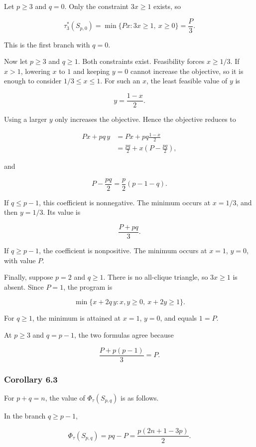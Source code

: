\documentclass[
  11pt,
]{article}
\begin{document}
Let \(p\ge3\) and \(q=0\). Only the constraint \(3x\ge1\) exists, so

\[
\tau_3^*(S_{p,0})
=
\min\{Px:3x\ge1,\ x\ge0\}
=
\frac P3.
\]

This is the first branch with \(q=0\).

Now let \(p\ge3\) and \(q\ge1\). Both constraints exist. Feasibility
forces \(x\ge1/3\). If \(x>1\), lowering \(x\) to \(1\) and keeping
\(y=0\) cannot increase the objective, so it is enough to consider
\(1/3\le x\le1\). For such an \(x\), the least feasible value of \(y\)
is

\[
y=\frac{1-x}{2}.
\]

Using a larger \(y\) only increases the objective. Hence the objective
reduces to

\[
\begin{aligned}
Px+pq\,y
&=
Px+pq\frac{1-x}{2}\\
&=
\frac{pq}{2}
+
x\left(P-\frac{pq}{2}\right),
\end{aligned}
\]

and

\[
P-\frac{pq}{2}
=
\frac p2(p-1-q).
\]

If \(q\le p-1\), this coefficient is nonnegative. The minimum occurs at
\(x=1/3\), and then \(y=1/3\). Its value is

\[
\frac{P+pq}{3}.
\]

If \(q\ge p-1\), the coefficient is nonpositive. The minimum occurs at
\(x=1\), \(y=0\), with value \(P\).

Finally, suppose \(p=2\) and \(q\ge1\). There is no all-clique triangle,
so \(3x\ge1\) is absent. Since \(P=1\), the program is

\[
\min\{x+2q\,y:x,y\ge0,\ x+2y\ge1\}.
\]

For \(q\ge1\), the minimum is attained at \(x=1\), \(y=0\), and equals
\(1=P\).

At \(p\ge3\) and \(q=p-1\), the two formulas agree because

\[
\frac{P+p(p-1)}{3}=P.
\]

\subsubsection{Corollary 6.3}\label{corollary-6.3}

For \(p+q=n\), the value of \(\Phi_\tau(S_{p,q})\) is as follows.

In the branch \(q\ge p-1\),

\[
\Phi_\tau(S_{p,q})
=
pq-P
=
\frac{p(2n+1-3p)}2.
\tag{6.1}
\]
\end{document}
